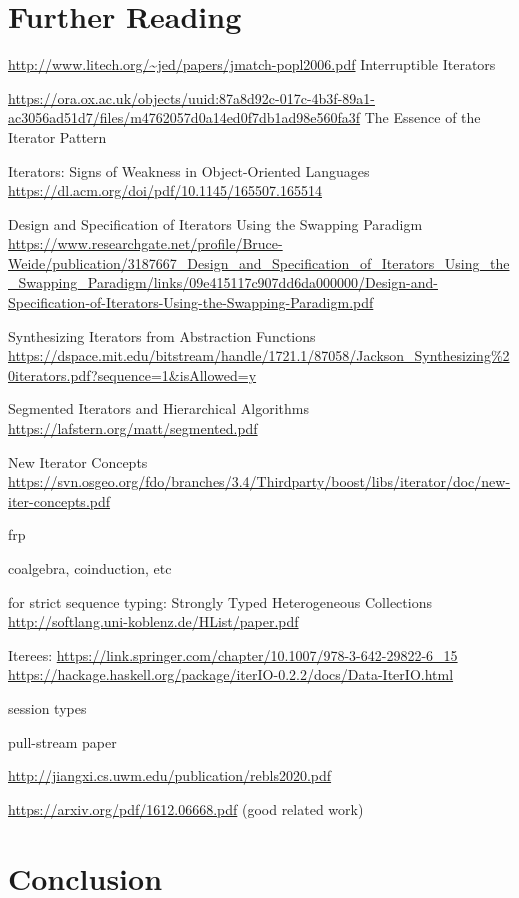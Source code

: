 \documentclass[sigplan,screen,10pt,anonymous,review]{acmart}
\begin{document}
\section{Further Reading}



\url{http://www.litech.org/~jed/papers/jmatch-popl2006.pdf} Interruptible Iterators

\url{https://ora.ox.ac.uk/objects/uuid:87a8d92c-017c-4b3f-89a1-ac3056ad51d7/files/m4762057d0a14ed0f7db1ad98e560fa3f} The Essence of the Iterator Pattern

Iterators: Signs of Weakness in Object-Oriented Languages \url{https://dl.acm.org/doi/pdf/10.1145/165507.165514}

Design and Specification of Iterators Using the Swapping Paradigm \url{https://www.researchgate.net/profile/Bruce-Weide/publication/3187667_Design_and_Specification_of_Iterators_Using_the_Swapping_Paradigm/links/09e415117c907dd6da000000/Design-and-Specification-of-Iterators-Using-the-Swapping-Paradigm.pdf}

Synthesizing Iterators from Abstraction Functions \url{https://dspace.mit.edu/bitstream/handle/1721.1/87058/Jackson_Synthesizing%20iterators.pdf?sequence=1&isAllowed=y}

Segmented Iterators and Hierarchical Algorithms \url{https://lafstern.org/matt/segmented.pdf}

New Iterator Concepts \url{https://svn.osgeo.org/fdo/branches/3.4/Thirdparty/boost/libs/iterator/doc/new-iter-concepts.pdf}

frp

coalgebra, coinduction, etc

for strict sequence typing: Strongly Typed Heterogeneous Collections \url{http://softlang.uni-koblenz.de/HList/paper.pdf}

Iterees: 
\url{https://link.springer.com/chapter/10.1007/978-3-642-29822-6_15}
\url{https://hackage.haskell.org/package/iterIO-0.2.2/docs/Data-IterIO.html}

session types

pull-stream paper

\url{http://jiangxi.cs.uwm.edu/publication/rebls2020.pdf}

\url{https://arxiv.org/pdf/1612.06668.pdf} (good related work)

\section{Conclusion}\label{conclusion}
\end{document}
